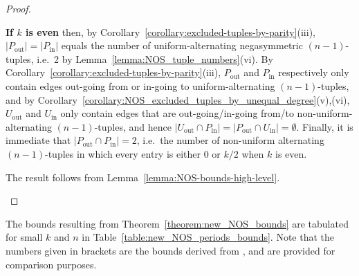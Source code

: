 \documentclass[a4paper,11pt]{article}
\theoremstyle{plain}
\theoremstyle{definition}
\theoremstyle{remark}
\begin{document}
\begin{proof}
\begin{itemize}
    {\bf If $k$ is even} then, by Corollary~\ref{corollary:excluded-tuples-by-parity}(iii),
    $|P_{\text{out}}|=|P_{\text{in}}|$ equals the number of uniform-alternating negasymmetric
    $(n-1)$-tuples, i.e.\ 2 by Lemma~\ref{lemma:NOS_tuple_numbers}(vi).
     \newline By Corollary~\ref{corollary:excluded-tuples-by-parity}(iii), $P_{\text{out}}$
    and $P_{\text{in}}$ respectively only contain edges out-going from or in-going to
    uniform-alternating $(n-1)$-tuples, and by
    Corollary~\ref{corollary:NOS_excluded_tuples_by_unequal_degree}(v),(vi), $U_{\text{out}}$
    and $U_{\text{in}}$ only contain edges that are out-going/in-going from/to
    non-uniform-alternating $(n-1)$-tuples, and hence $|U_{\text{out}}\cap
    P_{\text{in}}|=|P_{\text{out}}\cap U_{\text{in}}|=\emptyset$.
     \newline Finally, it is immediate that $|P_{\text{out}}\cap P_{\text{in}}|=2$,
    i.e.\ the number of non-uniform alternating $(n-1)$-tuples in which every entry is either 0
    or $k/2$ when $k$ is even.

    The result follows from Lemma~\ref{lemma:NOS-bounds-high-level}.

\end{itemize}
\end{proof}

The bounds resulting from Theorem~\ref{theorem:new_NOS_bounds} are tabulated for small $k$ and $n$
in Table~\ref{table:new_NOS_periods_bounds}.  Note that the numbers given in brackets are the
bounds derived from \cite[Theorem 3.10]{Mitchell25a}, and are provided for comparison purposes.
\end{document}
